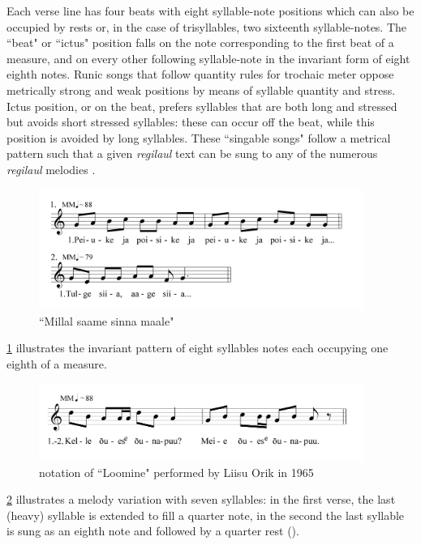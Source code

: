 Each verse line has four beats with eight syllable-note positions which can also be occupied by rests or, in the case of trisyllables, two sixteenth syllable-notes. The ``beat" or ``ictus" position falls on the note corresponding to the first beat of a measure, and on every other following syllable-note in the invariant form of eight eighth notes. Runic songs that follow quantity rules for trochaic meter oppose metrically strong and weak positions by means of syllable quantity and stress. Ictus position, or on the beat, prefers syllables that are both long and stressed but avoids short stressed syllables: these can occur off the beat, while this position is avoided by long syllables. 
These ``singable songs" \citep{tormis1985} follow a metrical pattern such that a given {\it regilaul} text can be sung to any of the numerous {\it regilaul} melodies \citep{rossLehiste2001}. 


\begin{figure}[ht]
\begin{center}
\includegraphics[width=300pt]{figures/045.png}
\caption{``Millal saame sinna maale"}
\label{045}
\end{center}
\end{figure}
\ref{045} illustrates the invariant pattern of eight syllables notes each occupying one eighth of a  measure. 

\begin{figure}[hb]
\begin{center}
\includegraphics[width=300pt]{figures/077.png}
\caption{notation of ``Loomine" performed by Liisu Orik in 1965}
\label{077}
\end{center}
\end{figure}
\ref{077} illustrates a melody variation with seven syllables: in the first verse, the last (heavy) syllable is extended to fill a quarter note, in the second the last syllable is sung as an eighth note and followed by a quarter rest (\quaverRest). 

